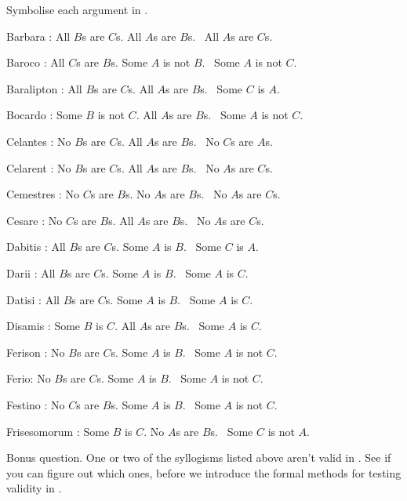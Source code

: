 \documentclass[PHIL101-Textbook.tex]{subfiles}
\begin{document}
Symbolise each argument in \pl.
\begin{earg}
\item[Barbara]: All $B$s are $C$s. All $A$s are $B$s.
	\therefore\  All $A$s are $C$s.
\item[Baroco]: All $C$s are $B$s. Some $A$ is not $B$.
	\therefore\  Some $A$ is not $C$.
\item[Baralipton]: All $B$s are $C$s. All $A$s are $B$s.
	\therefore\  Some $C$ is $A$.
\item[Bocardo]: Some $B$ is not $C$. All $A$s are $B$s.
	\therefore\  Some $A$ is not $C$.
\item[Celantes]: No $B$s are $C$s. All $A$s are $B$s.
	\therefore\  No $C$s are $A$s.
\item[Celarent]: No $B$s are $C$s. All $A$s are $B$s.
	\therefore\  No $A$s are $C$s.
\item[Cemestres]: No $C$s are $B$s. No $A$s are $B$s.
	\therefore\  No $A$s are $C$s.
\item[Cesare]: No $C$s are $B$s. All $A$s are $B$s.
	\therefore\  No $A$s are $C$s.
\item[Dabitis]: All $B$s are $C$s. Some $A$ is $B$.
	\therefore\  Some $C$ is $A$.
\item[Darii]: All $B$s are $C$s. Some $A$ is $B$.
	\therefore\  Some $A$ is $C$.
\item[Datisi]: All $B$s are $C$s. Some $A$ is $B$.
	\therefore\  Some $A$ is $C$.
\item[Disamis]: Some $B$ is $C$. All $A$s are $B$s.
	\therefore\  Some $A$ is $C$.
\item[Ferison]: No $B$s are $C$s. Some $A$ is $B$.
	\therefore\  Some $A$ is not $C$.
\item[Ferio:] No $B$s are $C$s. Some $A$ is $B$.
	\therefore\  Some $A$ is not $C$.
\item[Festino]: No $C$s are $B$s. Some $A$ is $B$.
	\therefore\  Some $A$ is not $C$.
\item[Frisesomorum]: Some $B$ is $C$. No $A$s are $B$s.
	\therefore\  Some $C$ is not $A$.
\end{earg}

\noindent\problempart Bonus question. One or two of the syllogisms listed above aren't valid in \pl. See if you can figure out which ones, before we introduce the formal methods for testing validity in \pl.

\end{document}
